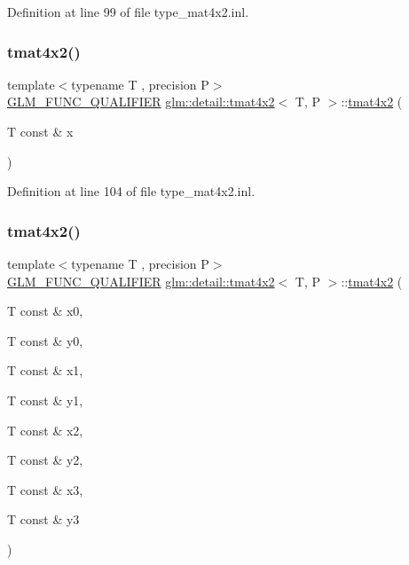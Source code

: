 Definition at line 99 of file type\+\_\+mat4x2.\+inl.

\mbox{\label{structglm_1_1detail_1_1tmat4x2_a7e8cb6213554a2961c3725c89e3eb168}} 
\subsubsection{\texorpdfstring{tmat4x2()}{tmat4x2()}\hspace{0.1cm}{\footnotesize\ttfamily [5/22]}}
{\footnotesize\ttfamily template$<$typename T , precision P$>$ \\
\hyperlink{setup_8hpp_a33fdea6f91c5f834105f7415e2a64407}{G\+L\+M\+\_\+\+F\+U\+N\+C\+\_\+\+Q\+U\+A\+L\+I\+F\+I\+ER} \hyperlink{structglm_1_1detail_1_1tmat4x2}{glm\+::detail\+::tmat4x2}$<$ T, P $>$\+::\hyperlink{structglm_1_1detail_1_1tmat4x2}{tmat4x2} (\begin{DoxyParamCaption}\item[{T const \&}]{x }\end{DoxyParamCaption})\hspace{0.3cm}{\ttfamily [explicit]}}



Definition at line 104 of file type\+\_\+mat4x2.\+inl.

\mbox{\label{structglm_1_1detail_1_1tmat4x2_af11c8214ce2df13c925feeae262c1916}} 
\subsubsection{\texorpdfstring{tmat4x2()}{tmat4x2()}\hspace{0.1cm}{\footnotesize\ttfamily [6/22]}}
{\footnotesize\ttfamily template$<$typename T , precision P$>$ \\
\hyperlink{setup_8hpp_a33fdea6f91c5f834105f7415e2a64407}{G\+L\+M\+\_\+\+F\+U\+N\+C\+\_\+\+Q\+U\+A\+L\+I\+F\+I\+ER} \hyperlink{structglm_1_1detail_1_1tmat4x2}{glm\+::detail\+::tmat4x2}$<$ T, P $>$\+::\hyperlink{structglm_1_1detail_1_1tmat4x2}{tmat4x2} (\begin{DoxyParamCaption}\item[{T const \&}]{x0,  }\item[{T const \&}]{y0,  }\item[{T const \&}]{x1,  }\item[{T const \&}]{y1,  }\item[{T const \&}]{x2,  }\item[{T const \&}]{y2,  }\item[{T const \&}]{x3,  }\item[{T const \&}]{y3 }\end{DoxyParamCaption})}




